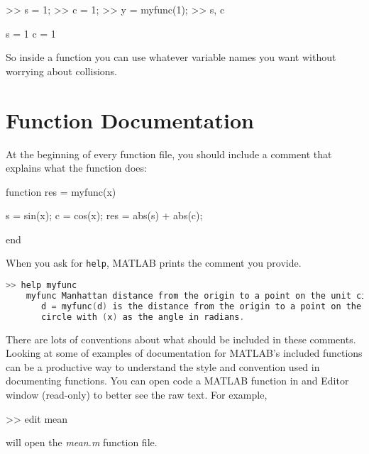\begin{code}
>> s = 1;
>> c = 1;
>> y = myfunc(1);
>> s, c

s = 1
c = 1
\end{code}

So inside a function you can use whatever variable names you
want without worrying about collisions.



\section{Function Documentation}


At the beginning of every function file, you should include a comment that explains what the function does:


\begin{code}
    function res = myfunc(x)
    
        s = sin(x);
        c = cos(x);
        res = abs(s) + abs(c);
    
    end
\end{code}

When you ask for \lstinline{help}, MATLAB prints the comment you provide.


\begin{lstlisting}[language=C, keywordstyle=\bfseries, morekeywords={myfunc}]
    >> help myfunc
    myfunc Manhattan distance from the origin to a point on the unit circle.
       d = myfunc(d) is the distance from the origin to a point on the unit
       circle with (x) as the angle in radians.
\end{lstlisting}

There are lots of conventions about what should be included
in these comments.  Looking at some of examples of documentation for MATLAB's included functions can be a productive way to understand the style and convention used in documenting functions.  You can open code a MATLAB function in and Editor window (read-only) to better see the raw text.  For example,
\begin{code}
    >> edit mean
\end{code}
will open the \emph{mean.m} function file.


